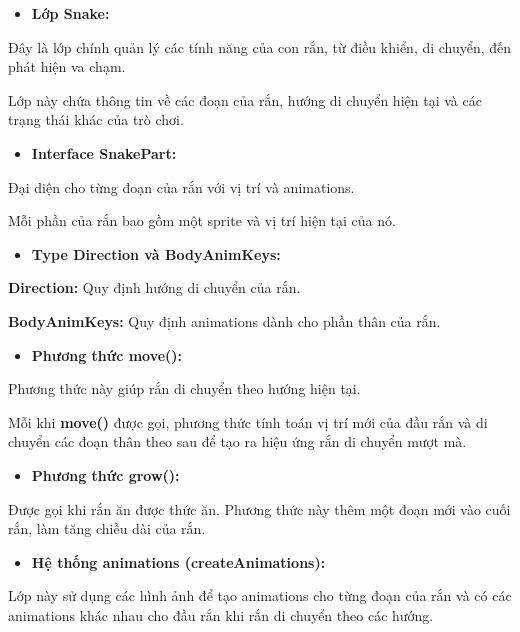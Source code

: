 \documentclass[a4paper, 12pt]{article}
\begin{document}
\begin{itemize}
    \item \textbf{Lớp Snake:}
\end{itemize}

Đây là lớp chính quản lý các tính năng của con rắn, từ điều khiển, di chuyển, đến phát hiện va chạm.

Lớp này chứa thông tin về các đoạn của rắn, hướng di chuyển hiện tại và các trạng thái khác của trò chơi.

\begin{itemize}
    \item \textbf{Interface SnakePart:}
\end{itemize}

Đại diện cho từng đoạn của rắn với vị trí và animations.

Mỗi phần của rắn bao gồm một sprite và vị trí hiện tại của nó.

\begin{itemize}
    \item \textbf{Type Direction và BodyAnimKeys:}
\end{itemize}

\textbf{Direction:} Quy định hướng di chuyển của rắn.

\textbf{BodyAnimKeys:} Quy định animations dành cho phần thân của rắn.

\begin{itemize}
    \item \textbf{Phương thức move():}
\end{itemize}

Phương thức này giúp rắn di chuyển theo hướng hiện tại.

Mỗi khi \textbf{move()} được gọi, phương thức tính toán vị trí mới của đầu rắn và di chuyển các đoạn thân theo sau để tạo ra hiệu ứng rắn di chuyển mượt mà.

\begin{itemize}
    \item \textbf{Phương thức grow():}
\end{itemize}

Được gọi khi rắn ăn được thức ăn. Phương thức này thêm một đoạn mới vào cuối rắn, làm tăng chiều dài của rắn.

\begin{itemize}
    \item \textbf{Hệ thống animations (createAnimations):}
\end{itemize}

Lớp này sử dụng các hình ảnh để tạo animations cho từng đoạn của rắn và có các animations khác nhau cho đầu rắn khi rắn di chuyển theo các hướng.
\end{document}
